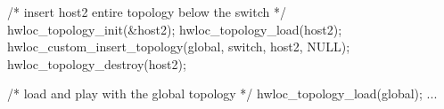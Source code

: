 \begin{DoxyPre}/* insert host2 entire topology below the switch */
hwloc\_topology\_init(&host2);
hwloc\_topology\_load(host2);
hwloc\_custom\_insert\_topology(global, switch, host2, NULL);
hwloc\_topology\_destroy(host2);\end{DoxyPre}



\begin{DoxyPre}/* load and play with the global topology */
hwloc\_topology\_load(global);
...
\end{DoxyPre}
 